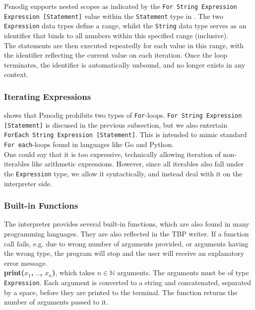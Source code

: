 Psnodig supports nested scopes as indicated by the \texttt{For String Expression Expression [Statement]} value within the \texttt{Statement} type in . The two \texttt{Expression} data types define a range, whilst the \texttt{String} data type serves as an identifier that binds to all numbers within this specified range (inclusive). \\

The statements are then executed repeatedly for each value in this range, with the identifier reflecting the current value on each iteration. Once the loop terminates, the identifier is automatically unbound, and no longer exists in any context.

\subsubsection{Iterating Expressions}

 shows that Psnodig prohibits two types of \texttt{For}-loops. \texttt{For String Expression [Statement]} is discused in the previous subsection, but we also entertain \texttt{ForEach String Expression [Statement]}. This is intended to mimic standard \texttt{For each}-loops found in languages like Go and Python. \\

One could say that it is too expressive, technically allowing iteration of non-iterables like arithmetic expressions. However, since all iterables also fall under the \texttt{Expression} type, we allow it syntactically, and instead deal with it on the interpreter side.

\subsubsection{Built-in Functions}

The interpreter provides several built-in functions, which are also found in many programming languages. They are also reflected in the TBP writer. If a function call fails, e.g. due to wrong number of arguments provided, or arguments having the wrong type, the program will stop and the user will receive an explanatory error message. \\

\textbf{print($x_{1}$, $..$, $x_{n}$)}, which takes $n \in \mathbb{N}$ arguments. The arguments must be of type \texttt{Expression}. Each argument is converted to a string and concatenated, separated by a space, before they are printed to the terminal. The function returns the number of arguments passed to it. \\

